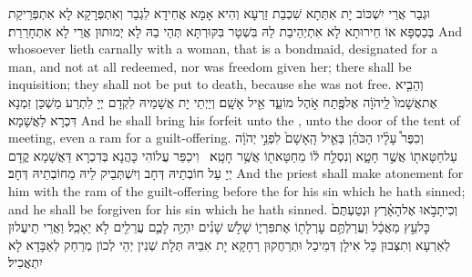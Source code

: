 {וּגְבַר אֲרֵי יִשְׁכּוֹב יָת אִתְּתָא שִׁכְבַת זַרְעָא וְהִיא אָמָא אֲחִידָא לִגְבַר וְאִתְפְּרָקָא לָא אִתְפְּרֵיקַת בְּכַסְפָּא אוֹ חֵירוּתָא לָא אִתְיְהֵיבַת לַהּ בִּשְׁטָר בִּקּוּרְתָּא תְּהֵי בַהּ לָא יְמוּתוּן אֲרֵי לָא אִתְחָרַרַת׃}
{And whosoever lieth carnally with a woman, that is a bondmaid, designated for a man, and not at all redeemed, nor was freedom given her; there shall be inquisition; they shall not be put to death, because she was not free.}{}
{וְהֵבִ֤יא אֶת\maqqaf אֲשָׁמוֹ֙ לַֽיהֹוָ֔ה אֶל\maqqaf פֶּ֖תַח אֹ֣הֶל מוֹעֵ֑ד אֵ֖יל אָשָֽׁם׃}
{וְיַיְתֵי יָת אֲשָׁמֵיהּ לִקְדָם יְיָ לִתְרַע מַשְׁכַּן זִמְנָא דִּכְרָא לַאֲשָׁמָא׃}
{And he shall bring his forfeit unto the \lord, unto the door of the tent of meeting, even a ram for a guilt-offering.}{}
{וְכִפֶּר֩ עָלָ֨יו הַכֹּהֵ֜ן בְּאֵ֤יל הָֽאָשָׁם֙ לִפְנֵ֣י יְהֹוָ֔ה עַל\maqqaf חַטָּאת֖וֹ אֲשֶׁ֣ר חָטָ֑א וְנִסְלַ֣ח ל֔וֹ מֵחַטָּאת֖וֹ אֲשֶׁ֥ר חָטָֽא׃ \petucha }
{וִיכַפַּר עֲלוֹהִי כָּהֲנָא בְּדִכְרָא דַּאֲשָׁמָא קֳדָם יְיָ עַל חוֹבְתֵיהּ דְּחָב וְיִשְׁתְּבֵיק לֵיהּ מֵחוֹבְתֵיהּ דְּחָב׃}
{And the priest shall make atonement for him with the ram of the guilt-offering before the \lord\space for his sin which he hath sinned; and he shall be forgiven for his sin which he hath sinned.}{}
{וְכִי\maqqaf תָבֹ֣אוּ אֶל\maqqaf הָאָ֗רֶץ וּנְטַעְתֶּם֙ כׇּל\maqqaf עֵ֣ץ מַאֲכָ֔ל וַעֲרַלְתֶּ֥ם עׇרְלָת֖וֹ אֶת\maqqaf פִּרְי֑וֹ שָׁלֹ֣שׁ שָׁנִ֗ים יִהְיֶ֥ה לָכֶ֛ם עֲרֵלִ֖ים לֹ֥א יֵאָכֵֽל׃}
{וַאֲרֵי תֵיעֲלוּן לְאַרְעָא וְתִצְּבוּן כָּל אִילָן דְּמֵיכַל וּתְרַחֲקוּן רַחָקָא יָת אִבֵּיהּ תְּלָת שְׁנִין יְהֵי לְכוֹן מְרַחַק לְאַבָּדָא לָא יִתְאֲכִיל׃}
